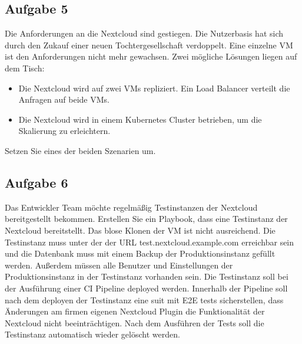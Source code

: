 \documentclass{article}
\begin{document}
    \subsection{Aufgabe 5}
    Die Anforderungen an die Nextcloud sind gestiegen. Die Nutzerbasis hat sich durch den Zukauf einer neuen Tochtergesellschaft verdoppelt.
    Eine einzelne VM ist den Anforderungen nicht mehr gewachsen.
    Zwei mögliche Lösungen liegen auf dem Tisch:
    \begin{itemize}
        \item Die Nextcloud wird auf zwei VMs repliziert. Ein Load Balancer verteilt die Anfragen auf beide VMs.
        \item Die Nextcloud wird in einem Kubernetes Cluster betrieben, um die Skalierung zu erleichtern.
    \end{itemize}
    Setzen Sie eines der beiden Szenarien um.

    \subsection{Aufgabe 6}
    Das Entwickler Team möchte regelmäßig Testinstanzen der Nextcloud bereitgestellt bekommen.
    Erstellen Sie ein Playbook, dass eine Testinstanz der Nextcloud bereitstellt.
    Das blose Klonen der VM ist nicht ausreichend. Die Testinstanz muss unter der der URL test.nextcloud.example.com erreichbar sein und 
    die Datenbank muss mit einem Backup der Produktionsinstanz gefüllt werden.
    Außerdem müssen alle Benutzer und Einstellungen der Produktionsinstanz in der Testinstanz vorhanden sein.
    Die Testinstanz soll bei der Ausführung einer CI Pipeline deployed werden.
    Innerhalb der Pipeline soll nach dem deployen der Testinstanz eine suit mit E2E tests sicherstellen,
    dass Änderungen am firmen eigenen Nextcloud Plugin die Funktionalität der Nextcloud nicht beeinträchtigen.
    Nach dem Ausführen der Tests soll die Testinstanz automatisch wieder gelöscht werden.
\end{document}
